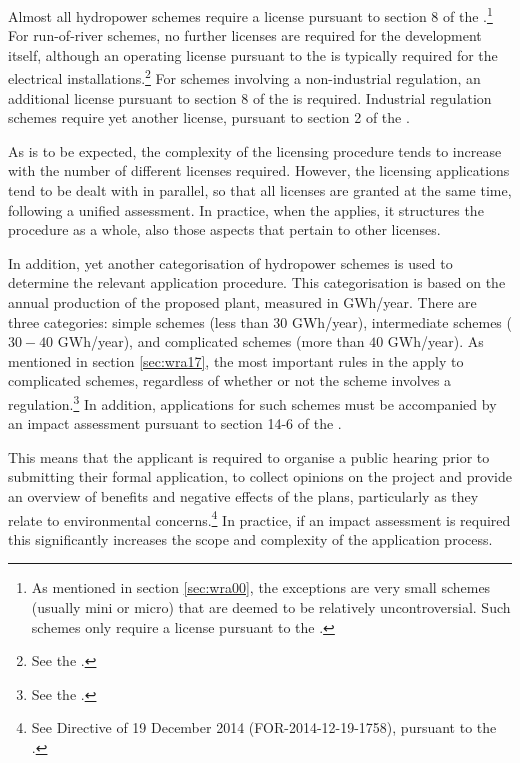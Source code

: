 Almost all hydropower schemes require a license pursuant to section 8 of the \cite{wra00}.\footnote{As mentioned in section \ref{sec:wra00}, the exceptions are very small schemes (usually mini or micro) that are deemed to be relatively uncontroversial. Such schemes only require a license pursuant to the \cite{pb08}.} For run-of-river schemes, no further licenses are required for the development itself, although an operating license pursuant to the \cite{ea90} is typically required for the electrical installations.\footnote{See the \dni\cite[3-1]{ea90}.} For schemes involving a non-industrial regulation, an additional license pursuant to section 8 of the \cite{wra17} is required. Industrial regulation schemes require yet another license, pursuant to section 2 of the \cite{ica17}.

As is to be expected, the complexity of the licensing procedure tends to increase with the number of different licenses required. However, the licensing applications tend to be dealt with in parallel, so that all licenses are granted at the same time, following a unified assessment. In practice, when the \cite{wra17} applies, it structures the procedure as a whole, also those aspects that pertain to other licenses. 

In addition, yet another categorisation of hydropower schemes is used to determine the relevant application procedure. This categorisation is based on the annual production of the proposed plant, measured in GWh/year. There are three categories: simple schemes (less than $30$ GWh/year), intermediate schemes ($30 - 40$ GWh/year), and complicated schemes (more than $40$ GWh/year). As mentioned in section \ref{sec:wra17}, the most important rules in the \cite{wra17} apply to complicated schemes, regardless of whether or not the scheme involves a regulation.\footnote{See the \dni\cite[19]{wra00}.} In addition, applications for such schemes must be accompanied by an impact assessment pursuant to section 14-6 of the \cite{pb08}.

This means that the applicant is required to organise a public hearing prior to submitting their formal application, to collect opinions on the project and provide an overview of benefits and negative effects of the plans, particularly as they relate to environmental concerns.\footnote{See Directive of 19 December 2014 (FOR-2014-12-19-1758), pursuant to the \dni\cite[1-2,14-6]{pb08}.} In practice, if an impact assessment is required this significantly increases the scope and complexity of the application process.

